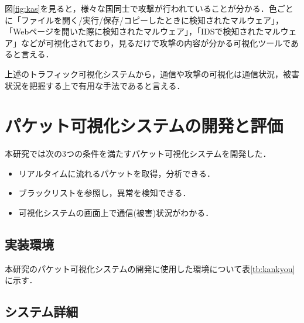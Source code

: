 \documentclass{thesis}
\begin{document}
図\ref{fig:kas}を見ると，様々な国同士で攻撃が行われていることが分かる．色ごとに「ファイルを開く/実行/保存/コピーしたときに検知されたマルウェア」，「Webページを開いた際に検知されたマルウェア」，「IDSで検知されたマルウェア」などが可視化されており，見るだけで攻撃の内容が分かる可視化ツールであると言える．

\vspace{0.2in}
上述のトラフィック可視化システムから，通信や攻撃の可視化は通信状況，被害状況を把握する上で有用な手法であると言える．


\chapter{パケット可視化システムの開発と評価}

本研究では次の3つの条件を満たすパケット可視化システムを開発した．

\begin{itemize}
\item リアルタイムに流れるパケットを取得，分析できる．
\item ブラックリストを参照し，異常を検知できる．
\item 可視化システムの画面上で通信(被害)状況がわかる．
\end{itemize}

\section{実装環境}

本研究のパケット可視化システムの開発に使用した環境について表\ref{tb:kankyou}に示す．

\begin{table}[htbp]
  \centering
  \caption{開発環境}
  \label{tb:kankyou}
\end{table}

\section{システム詳細}
\end{document}
